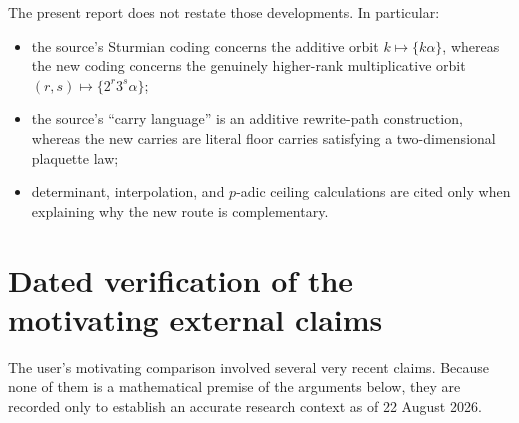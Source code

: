 \documentclass[11pt]{article}
\theoremstyle{definition}
\theoremstyle{remark}
\begin{document}
The present report does not restate those developments.  In particular:

\begin{itemize}
\item the source's Sturmian coding concerns the additive orbit
$k\mapsto\{k\alpha\}$, whereas the new coding concerns the genuinely
higher-rank multiplicative orbit $(r,s)\mapsto\{2^r3^s\alpha\}$;
\item the source's ``carry language'' is an additive rewrite-path construction,
whereas the new carries are literal floor carries satisfying a two-dimensional
plaquette law;
\item determinant, interpolation, and $p$-adic ceiling calculations are cited only
when explaining why the new route is complementary.
\end{itemize}

\section{Dated verification of the motivating external claims}

The user's motivating comparison involved several very recent claims.  Because none
of them is a mathematical premise of the arguments below, they are recorded only to
establish an accurate research context as of 22 August 2026.
\end{document}
